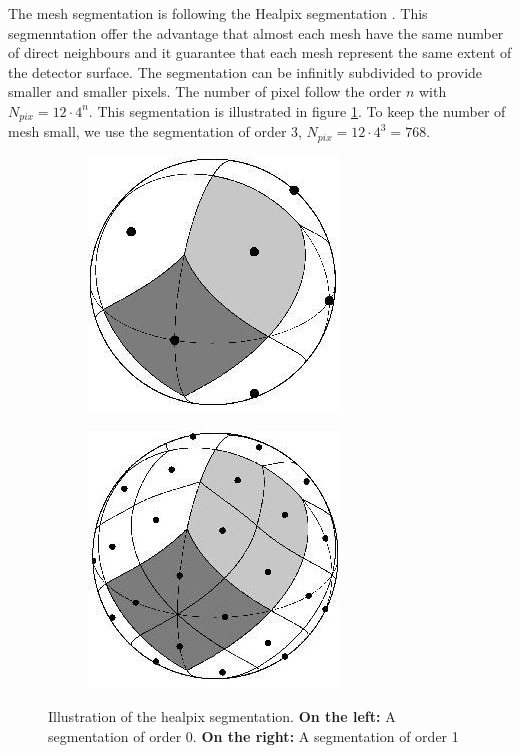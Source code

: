 \documentclass[../main.tex]{subfiles}
\begin{document}
The mesh segmentation is following the Healpix segmentation \cite{gorski_healpix_2005}. This segmenntation offer the advantage that almost each mesh have the same number of direct neighbours and it guarantee that each mesh represent the same extent of the detector surface. The segmentation can be infinitly subdivided to provide smaller and smaller pixels. The number of pixel follow the order $n$ with $N_{pix} = 12 \cdot 4^n$. This segmentation is illustrated in figure \ref{fig:jgnn:healpix}. To keep the number of mesh small, we use the segmentation of order 3, $N_{pix} = 12 \cdot 4^3 = 768$.

\begin{figure}
  \centering
  \begin{subfigure}[t]{0.48\linewidth}
    \centering
    \includegraphics[width=0.5\linewidth]{images/jgnn/healpix_0.jpg}
  \end{subfigure}
  \hfill
  \begin{subfigure}[t]{0.48\linewidth}
    \centering
    \includegraphics[width=0.5\linewidth]{images/jgnn/healpix_1.jpg}
  \end{subfigure}
  \caption{Illustration of the healpix segmentation. \textbf{On the left:} A segmentation of order 0. \textbf{On the right:} A segmentation of order 1}
  \label{fig:jgnn:healpix}
\end{figure}
\end{document}
